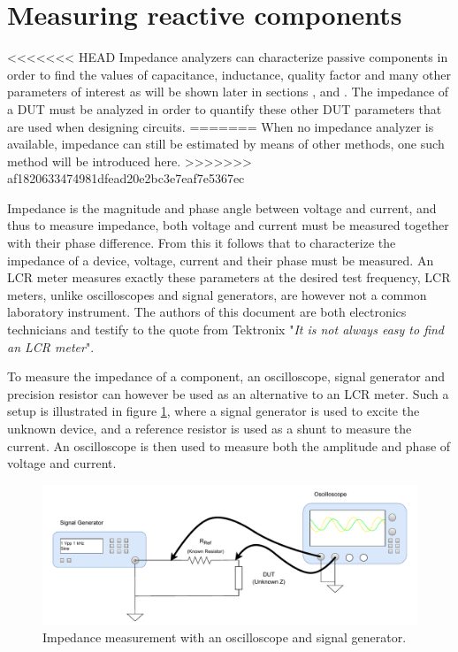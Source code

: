 \section{Measuring reactive components} \label{sec:MeasureReactiveComponents}
<<<<<<< HEAD
Impedance analyzers can characterize passive components in order to find the values of capacitance, inductance, quality factor and many other parameters of interest as will be shown later in sections ,  and . The impedance of a DUT must be analyzed in order to quantify these other DUT parameters that are used when designing circuits.
=======
When no impedance analyzer is available, impedance can still be estimated by means of other methods, one such method will be introduced here.
>>>>>>> af1820633474981dfead20e2bc3e7eaf7e5367ec

Impedance is the magnitude and phase angle between voltage and current, and thus to measure impedance, both voltage and current must be measured together with
their phase difference. From this it follows that to characterize the impedance of a device, voltage, current and their phase must be measured. An LCR meter measures exactly these parameters
at the desired test frequency, LCR meters, unlike oscilloscopes and signal generators, are however not a common laboratory instrument. The authors of this document are both
electronics technicians and testify to the quote from Tektronix \Cite{TextronixZMeas} "\textit{It is not always easy to find an LCR meter}". 

To measure the impedance of a component, an oscilloscope, signal generator and precision resistor can however be used as an alternative to an LCR meter. Such a setup is illustrated in figure \ref{fig_2.1_ImpedanceMeas}, where a signal generator is used to excite the unknown device, and a reference resistor is used as a shunt to measure the current. An oscilloscope is then used to measure both the amplitude and phase of voltage and current. 

\begin{figure}[H]
    \centering
    \includegraphics[width=1\textwidth]{Sections/2_ProblemAnalysis/Figures/ScopeGenZMeas.pdf}
    \caption{Impedance measurement with an oscilloscope and signal generator.}
    \label{fig_2.1_ImpedanceMeas}
\end{figure}

